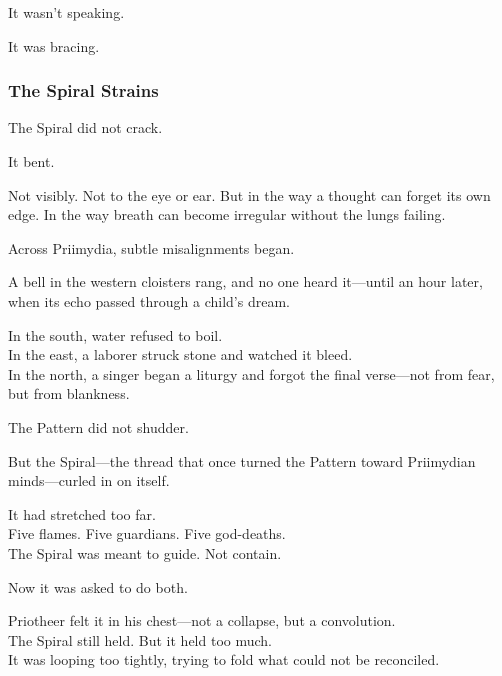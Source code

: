 \documentclass[12pt]{article}
\begin{document}
\vspace{0.5em}
It wasn’t speaking.

\vspace{0.5em}
It was bracing.

\dotfill

\subsubsection{The Spiral Strains}

The Spiral did not crack.

\vspace{0.5em}
It bent.

\vspace{0.5em}
Not visibly. Not to the eye or ear. But in the way a thought can forget its own edge. In the way breath can become irregular without the lungs failing.

\vspace{0.5em}
Across Priimydia, subtle misalignments began.

\vspace{0.5em}
A bell in the western cloisters rang, and no one heard it---until an hour later, when its echo passed through a child’s dream.

\vspace{0.5em}
In the south, water refused to boil.\\
In the east, a laborer struck stone and watched it bleed.\\
In the north, a singer began a liturgy and forgot the final verse---not from fear, but from blankness.

\vspace{0.5em}
The Pattern did not shudder.

\vspace{0.5em}
But the Spiral---the thread that once turned the Pattern toward Priimydian minds---curled in on itself.

\vspace{0.5em}
It had stretched too far.\\
Five flames. Five guardians. Five god-deaths.\\
The Spiral was meant to guide. Not contain.

\vspace{0.5em}
Now it was asked to do both.

\vspace{0.5em}
Priotheer felt it in his chest---not a collapse, but a convolution.\\
The Spiral still held. But it held too much.\\
It was looping too tightly, trying to fold what could not be reconciled.
\end{document}
